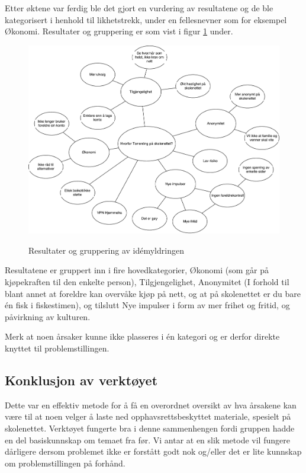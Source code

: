 Etter øktene var ferdig ble det gjort en vurdering av resultatene og de ble kategorisert i henhold til likhetstrekk, under en fellesnevner som for eksempel Økonomi. Resultater og gruppering er som vist i figur \ref{fig:idemyldring} under.

\begin{figure}[H]
    \centering
    \includegraphics[scale=0.45]{case_1/bilder/idemyldring}
    \label{fig:idemyldring}
    \caption[Idémyldring]{Resultater og gruppering av idémyldringen}
\end{figure}

Resultatene er gruppert inn i fire hovedkategorier, Økonomi (som går på kjøpekraften til den enkelte person), Tilgjengelighet, Anonymitet (I forhold til blant annet at foreldre kan overvåke kjøp på nett, og at på skolenettet er du bare én fisk i fiskestimen), og tilslutt Nye impulser i form av mer frihet og fritid, og påvirkning av kulturen.

Merk at noen årsaker kunne ikke plasseres i én kategori og er derfor direkte knyttet til problemstillingen. 


\subsection{Konklusjon av verktøyet}
Dette var en effektiv metode for å få en overordnet oversikt av hva årsakene kan være til at noen velger å laste ned opphavsrettsbeskyttet materiale, spesielt på skolenettet. Verktøyet fungerte bra i denne sammenhengen fordi gruppen hadde en del basiskunnskap om temaet fra før. Vi antar at en slik metode vil fungere dårligere dersom problemet ikke er forstått godt nok og/eller det er lite kunnskap om problemstillingen på forhånd.